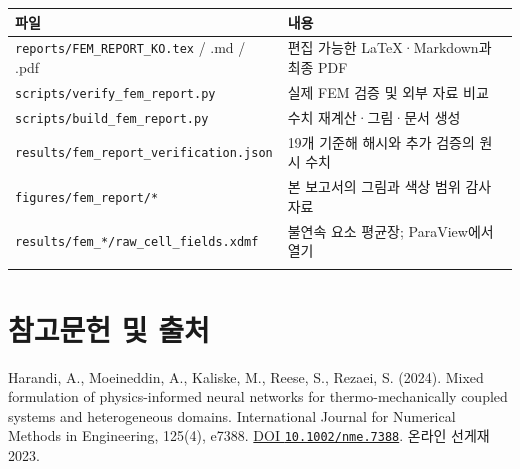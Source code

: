 \documentclass[10pt,a4paper]{article}
\begin{document}
\par\begin{minipage}{\linewidth}\begin{tabular}{>{\raggedright\arraybackslash}p{}>{\raggedright\arraybackslash}p{}}

\rowcolor{tint} \textbf{파일} & \textbf{내용}\\\midrule

\nolinkurl{reports/FEM_REPORT_KO.tex} / .md / .pdf & 편집 가능한 LaTeX·Markdown과 최종 PDF\\\addlinespace[2pt]

\nolinkurl{scripts/verify_fem_report.py} & 실제 FEM 검증 및 외부 자료 비교\\\addlinespace[2pt]

\nolinkurl{scripts/build_fem_report.py} & 수치 재계산·그림·문서 생성\\\addlinespace[2pt]

\nolinkurl{results/fem_report_verification.json} & 19개 기준해 해시와 추가 검증의 원시 수치\\\addlinespace[2pt]

\nolinkurl{figures/fem_report/*} & 본 보고서의 그림과 색상 범위 감사 자료\\\addlinespace[2pt]

\nolinkurl{results/fem_*/raw_cell_fields.xdmf} & 불연속 요소 평균장; ParaView에서 열기\\\addlinespace[2pt]

\bottomrule\end{tabular}\end{minipage}\par\vspace{5pt}\endgroup

\clearpage

\section{참고문헌 및 출처}

{\small\color{muted} Harandi, A., Moeineddin, A., Kaliske, M., Reese, S., Rezaei, S. (2024). Mixed formulation of physics-informed neural networks for thermo-mechanically coupled systems and heterogeneous domains. International Journal for Numerical Methods in Engineering, 125(4), e7388. \href{https://doi.org/10.1002/nme.7388}{DOI \nolinkurl{10.1002/nme.7388}}. 온라인 선게재 2023.\par}
\end{document}
